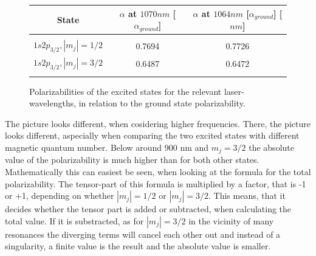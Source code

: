 \begin{figure}[h]
\begin{center}
\begin{tabular}{ccc}
State&$\alpha$ at $1070\unit{nm}$ [$\unit{\alpha_{ground}}$]&$\alpha$ at $1064\unit{nm}$ [$\unit{\alpha_{ground}}$] [$\unit{nm}$]\\\hline\hline\\
$1s2p_{3/2}, |m_j|=1/2$&0.7694&0.7726\\
$1s2p_{3/2}, |m_j|=3/2$&0.6487&0.6472\\
\\\hline
\end{tabular}
\end{center}
\caption{Polarizabilities of the excited states for the relevant laser-wavelengths, in relation to the ground state polarizability.}
\label{relativealpha}
\end{figure}

The picture looks different, when cosidering higher frequencies. There, the picture looks different, aspecially when comparing the two excited states with different magnetic quantum number. Below around 900 nm and $m_j=3/2$ the absolute value of the polarizability is much higher than for both other states. Mathematically this can easiest be seen, when looking at the formula for the total polarizability. The tensor-part of this formula is multiplied by a factor, that is -1 or +1, depending on whether $|m_j|=1/2$ or $|m_j|=3/2$. This means, that it decides whether the tensor part is added or subtracted, when calculating the total value. If it is substracted, as for $|m_j|=3/2$ in the vicinity of many resonances the diverging terms will cancel each other out and instead of a singularity, a finite value is the result and the absolute value is smaller.
